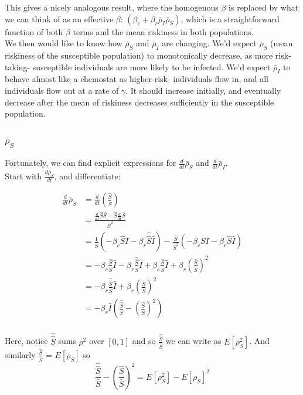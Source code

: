 \documentclass{article}
\begin{document}
This gives a nicely analogous result, where the homogenous $\beta$ is
replaced by what we can think of as an effective $\beta$:
$(\beta_c + \beta_r \bar \rho_I \bar\rho_S)$, which is a straightforward
function of both $\beta$ terms and the mean riskiness in both populations.\\

We then would like to know how $\bar\rho_S$ and $\bar\rho_I$ are changing.
We'd expect $\bar\rho_S$ (mean riskiness of the susceptible population) to
monotonically decrease, as more risk-taking- susceptible individuals are
more likely to be infected. We'd expect $\bar\rho_I$ to behave almost
like a chemostat as higher-risk- individuals flow in, and all individuals flow
out at a rate of $\gamma$. It should increase initially, and eventually decrease
after the mean of riskiness decreases sufficiently in the susceptible population.

\subsubsection{$\bar\rho_S$}

Fortunately, we can find explicit expressions for $\frac{d}{dt}\bar\rho_S$
and $\frac{d}{dt}\bar\rho_I$.\\

Start with $\frac{d\bar\rho_S}{dt}$, and differentiate:


\begin{align*}
\frac{d}{dt}\bar\rho_S
&= \frac{d}{dt} \left( \frac{\hat S}{\bar S} \right)\\
&= \frac{\frac{d}{dt} \hat S \bar S - \hat S \frac{d}{dt}\bar S}{\bar S^2}\\
&= \frac{1}{\bar S}\left(
-\beta_c\hat S \bar I - \beta_r \hat{\hat{S}}\hat I
\right)
- \frac{\hat S}{\bar S^2}\left(
-\beta_c \bar S \bar I - \beta_r \hat S \hat I
\right)\\
&= -\beta_c \frac{\hat S}{\bar S} \bar I
- \beta_r \frac{\hat{\hat{S}}}{\bar S}\hat{I}
+ \beta_c \frac{\hat S}{\bar S}\bar I
+ \beta_r \left(\frac{\hat S}{\bar S}\right)^2 \\
&= 
- \beta_r \frac{\hat{\hat{S}}}{\bar S}\hat{I}
+ \beta_r \left(\frac{\hat S}{\bar S}\right)^2 \\
&= -\beta_r \hat I \left(\frac{\hat{ \hat{ S}}}{\bar S} - \left(\frac{\hat S}{\bar S}\right)^2  \right)\\
\end{align*}

Here, notice $\hat{ \hat{ S}}$ sums $\rho^2$ over $[0, 1]$ and so
$\frac{\hat{ \hat{ S}}}{\bar S}$ we can write as $E[\rho_S^2]$. And similarly
$\frac{\hat S}{\bar S}$ = $E[\rho_S]$ so
$$
\frac{\hat{ \hat{ S}}}{\bar S} - \left(\frac{\hat S}{\bar S}\right)^2
= E[\rho_S^2] - E[\rho_S]^2 
$$
\end{document}

